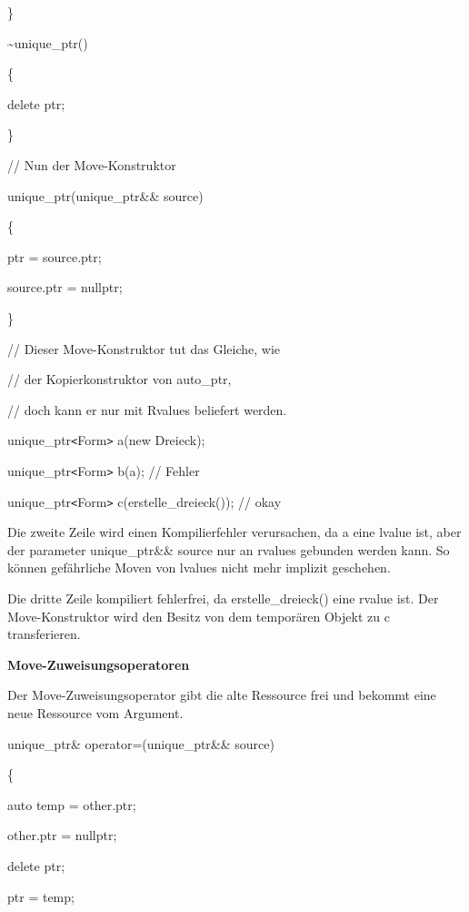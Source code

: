 \documentclass{article}
\begin{document}
\parindent=14pt
\}    

\vspace{12pt}
\textasciitilde{}unique\_ptr()    

\parindent=28pt
\{        

delete ptr;    

\parindent=43pt
\}

\parindent=0pt
// Nun der Move-Konstruktor    

unique\_ptr(unique\_ptr\&\& source)    

\parindent=14pt
\{        

\parindent=28pt
ptr = source.ptr;        

source.ptr = nullptr;    

\parindent=43pt
\}

\parindent=0pt
// Dieser Move-Konstruktor tut das Gleiche, wie

// der Kopierkonstruktor von auto\_ptr,

// doch kann er nur mit Rvalues beliefert werden.

unique\_ptr\texttt{<}Form\texttt{>} a(new Dreieck);

unique\_ptr\texttt{<}Form\texttt{>} b(a);                  // Fehler

unique\_ptr\texttt{<}Form\texttt{>} c(erstelle\_dreieck()); // okay

\vspace{12pt}
Die zweite Zeile wird einen Kompilierfehler verursachen, da a eine lvalue ist, 
aber der parameter unique\_ptr\&\& source nur an rvalues gebunden werden kann. 
So können gefährliche Moven von lvalues nicht mehr implizit geschehen.

Die dritte Zeile kompiliert fehlerfrei, da erstelle\_dreieck() eine rvalue ist. 
Der Move-Konstruktor wird den Besitz von dem temporären Objekt zu c transferieren.

\vspace{12pt}
\textbf{Move-Zuweisungsoperatoren}

Der Move-Zuweisungsoperator gibt die alte Ressource frei und bekommt eine neue 
Ressource vom Argument.

unique\_ptr\& operator=(unique\_ptr\&\& source)

\{    

\parindent=14pt
auto temp = other.ptr;    

other.ptr = nullptr;    

\parindent=28pt
delete ptr;    

\parindent=14pt
ptr = temp;    
\end{document}
